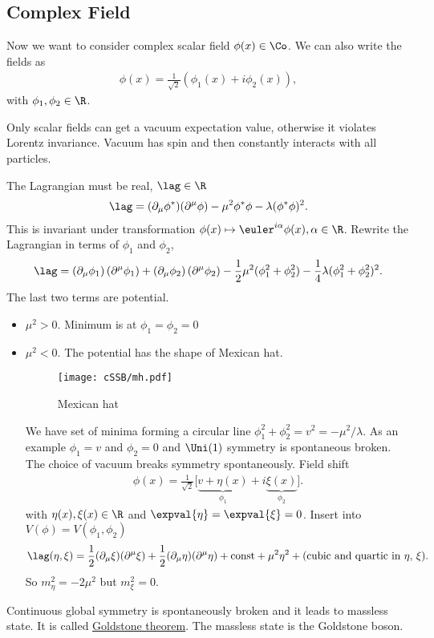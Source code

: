 \subsection{Complex Field}
Now we want to consider complex scalar field $\phi(x) \in \Co$. We can also write the fields as
\begin{align}
   \phi(x) = \frac{1}{\sqrt{2}} \left( \phi_1(x) + i\phi_2(x) \right),
\end{align}
with $\phi_1, \phi_2 \in \R$.

Only scalar fields can get a vacuum expectation value, otherwise it violates Lorentz invariance. Vacuum has spin and then constantly interacts with all particles. 

The Lagrangian must be real, $\lag \in \R$
\begin{align}
   \lag = ( \partial_\mu \phi^* ) ( \partial^\mu \phi ) - \mu^2 \phi^* \phi - \lambda (\phi^* \phi)^2.
\end{align}
This is invariant under transformation $\phi(x) \mapsto \euler^{i\alpha} \phi(x), \alpha \in \R$. Rewrite the Lagrangian in terms of $\phi_1$ and $\phi_2$,
\begin{align*}
   \lag =  \left( \partial_\mu \phi_1 \right) \left( \partial^\mu \phi_1 \right) + \left( \partial_\mu \phi_2 \right) \left( \partial^\mu \phi_2 \right) - \frac{1}{2} \mu^2 (\phi_1^2 + \phi_2^2) - \frac{1}{4} \lambda (\phi_1^2 + \phi_2^2)^2.
\end{align*}
The last two terms are potential.

\begin{itemize}
   \item $\mu^2 > 0$. Minimum is at $\phi_1 = \phi_2 = 0$
   \item $\mu^2 < 0$. The potential has the shape of Mexican hat.
   \begin{figure}[htpb]
      \centering
      \texttt{[image: cSSB/mh.pdf]}
      \caption{Mexican hat\cite{wikiSSB}}%
      \label{fig:mexicanHat}
   \end{figure}

      We have set of minima forming a circular line $\phi_1^2 + \phi_2^2 = v^2 = -{\mu^2}/{\lambda}$. As an example $\phi_1 = v$ and $\phi_2 = 0$ and $\Uni(1)$ symmetry is spontaneous broken. The choice of vacuum breaks symmetry spontaneously.
      Field shift
      \begin{align}
         \phi(x) = \frac{1}{\sqrt{2}} \Big[ \underbrace{v + \eta(x)}_{\phi_1} + i \underbrace{\xi(x)}_{\phi_2} \Big].
      \end{align}
      with $\eta(x), \xi(x) \in \R$ and $\expval{\eta} = \expval{\xi}=0$.
      Insert into $V(\phi) = V(\phi_1, \phi_2)$
      \begin{align}
         \lag(\eta, \xi) = \frac{1}{2} (\partial_\mu \xi) (\partial^\mu \xi) + \frac{1}{2} (\partial_\mu \eta) (\partial^\mu \eta) + \text{const} + \mu^2 \eta^2 + (\text{cubic and quartic in $\eta$, $\xi$}).
      \end{align}
      So $m_\eta^2 = -2\mu^2$ but $m_\xi^2 = 0$.
\end{itemize}
Continuous global symmetry is spontaneously broken and it leads to massless state. It is called \underline{Goldstone theorem}. The massless state is the Goldstone boson.

